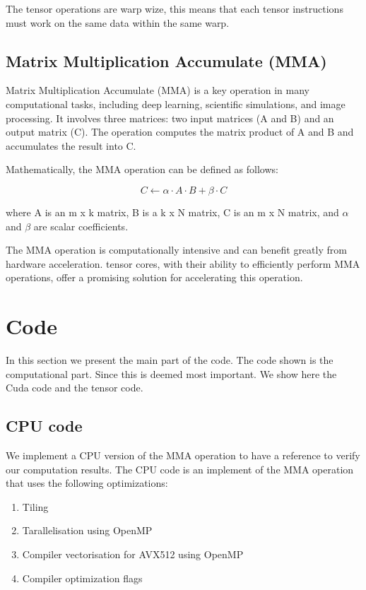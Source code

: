 \documentclass[conference]{IEEEtran}
\begin{document}
  The tensor operations are warp wize, this means that each tensor instructions must work on the same 
  data within the same warp.
  
  \subsection{Matrix Multiplication Accumulate (MMA)}\label{sec:mma}
  
  Matrix Multiplication Accumulate (MMA) is a key operation in many computational tasks, including deep 
  learning, scientific simulations, and image processing. It involves three matrices: two input matrices 
  (A and B) and an output matrix (C). The operation computes the matrix product of A and B and accumulates 
  the result into C.
  
  Mathematically, the MMA operation can be defined as follows:
  
  \[ C \leftarrow \alpha \cdot A \cdot B + \beta \cdot C \]
  
  where A is an m x k matrix, B is a k x N matrix, C is an m x N matrix, and $\alpha$ and $\beta$ are scalar coefficients.
  
  The MMA operation is computationally intensive and can benefit greatly from hardware acceleration. 
  tensor cores, with their ability to efficiently perform MMA operations, offer a promising solution 
  for accelerating this operation.
  
  
  \section{Code}
  In this section we present the main part of the code. The code shown is the computational part. Since this is
  deemed most important. We show here the Cuda code and the tensor code.

  \subsection{CPU code}\label{sec:CPUCode}
  We implement a CPU version of the MMA operation to have a reference to verify our computation results.
  The CPU code is an implement of the MMA operation that uses the following optimizations:
  \begin{enumerate}
    \item Tiling
    \item Tarallelisation using OpenMP
    \item Compiler vectorisation for AVX512 using OpenMP
    \item Compiler optimization flags
  \end{enumerate}
\end{document}
